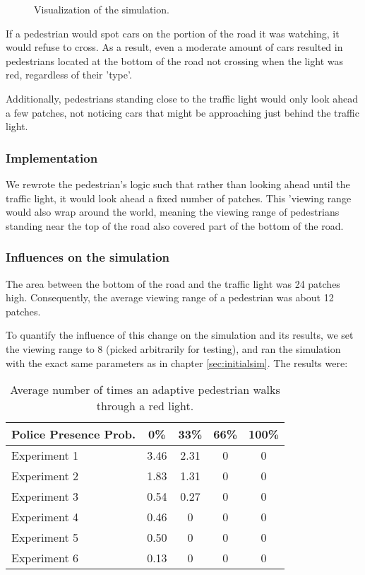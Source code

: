 \documentclass[a4paper]{article}
\begin{document}
\begin{figure}[H]
\centering
\caption{Visualization of the simulation.}
\label{ABlabel}
\end{figure}

If a pedestrian would spot cars on the portion of the road it was watching, it would refuse to cross. As a result, even a moderate amount of cars resulted in pedestrians located at the bottom of the road not crossing when the light was red, regardless of their 'type'.

Additionally, pedestrians standing close to the traffic light would only look ahead a few patches, not noticing cars that might be approaching just behind the traffic light.

\subsubsection{Implementation}
We rewrote the pedestrian's logic such that rather than looking ahead until the traffic light, it would look ahead a fixed number of patches. This 'viewing range would also wrap around the world, meaning the viewing range of pedestrians standing near the top of the road also covered part of the bottom of the road.

\subsubsection{Influences on the simulation}
The area between the bottom of the road and the traffic light was 24 patches high. Consequently, the average viewing range of a pedestrian was about 12 patches.

To quantify the influence of this change on the simulation and its results, we set the viewing range to 8 (picked arbitrarily for testing), and ran the simulation with the exact same parameters as in chapter \ref{sec:initialsim}. The results were:

\begin{table}[H]
\centering
\begin{tabular}{ l | c c c c }
  Police Presence Prob. & 0\% & 33\% & 66\% & 100\% \\ 
  \hline
  Experiment 1 & 3.46 & 2.31 & 0 & 0  \\
  Experiment 2 & 1.83 & 1.31 & 0 & 0  \\
  Experiment 3 & 0.54 & 0.27 & 0 & 0  \\
  Experiment 4 & 0.46 & 0    & 0 & 0  \\
  Experiment 5 & 0.50 & 0    & 0 & 0  \\
  Experiment 6 & 0.13 & 0    & 0 & 0  \\
\end{tabular}
\caption{Average number of times an adaptive 
pedestrian walks through a red light.}
\end{table}
\end{document}
